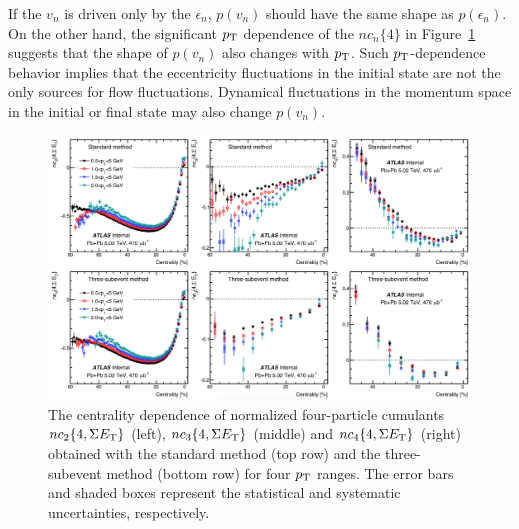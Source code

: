 If the $v_n$ is driven only by the $\epsilon_n$, $p(v_n)$ should have the same shape as $p(\epsilon_n)$. On the other hand, the significant $p_\text{T}$ dependence of the $nc_n\{4\}$ in Figure~\ref{fig:centfluc_ATLAS_nc_4pc} suggests that the shape of $p(v_n)$ also changes with $p_\text{T}$. Such $p_\text{T}$-dependence behavior implies that the eccentricity fluctuations in the initial state are not the only sources for flow fluctuations. Dynamical fluctuations in the momentum space in the initial or final state may also change $p(v_n)$.

\begin{figure}[H]
\centering
\includegraphics[width=.95\linewidth]{figs/chapter_centfluc/ATLAS_nc_4pc.png}
\caption{The centrality dependence of normalized four-particle cumulants $nc_2\{4, \Sigma E_\text{T}\}$ (left), $nc_3\{4, \Sigma E_\text{T}\}$ (middle) and $nc_4\{4, \Sigma E_\text{T}\}$ (right) obtained with the standard method (top row) and the three-subevent method (bottom row) for four $p_\text{T}$ ranges. The error bars and shaded boxes represent the statistical and systematic uncertainties, respectively.}
\label{fig:centfluc_ATLAS_nc_4pc}
\end{figure}

